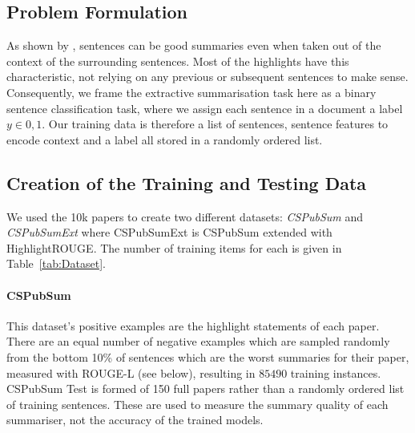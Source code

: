 \documentclass[11pt,a4paper]{article}
\begin{document}
\subsection{Problem Formulation}

As shown by , sentences can be good summaries even when taken out of the context of the surrounding sentences. Most of the highlights have this characteristic, not relying on any previous or subsequent sentences to make sense. Consequently, we frame the extractive summarisation task here as a binary sentence classification task, where we assign each sentence in a document a label $y \in {0,1}$. Our training data is therefore a list of sentences, sentence features to encode context and a label all stored in a randomly ordered list.
 

\subsection{Creation of the Training and Testing Data}
\label{sec:training_data}

We used the 10k papers to create two different datasets: \textit{CSPubSum} and \textit{CSPubSumExt} where CSPubSumExt is CSPubSum extended with HighlightROUGE. The number of training items for each is given in Table~\ref{tab:Dataset}.

\paragraph{CSPubSum} This dataset's positive examples are the highlight statements of each paper. There are an equal number of negative examples which are sampled randomly from the bottom 10\% of sentences which are the worst summaries for their paper, measured with ROUGE-L (see below), resulting in $85490$ training instances. CSPubSum Test is formed of 150 full papers rather than a randomly ordered list of training sentences. These are used to measure the summary quality of each summariser, not the accuracy of the trained models.
\end{document}
